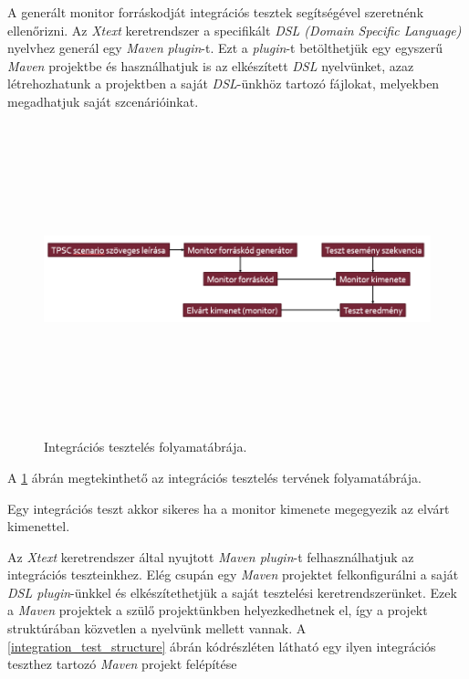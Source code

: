 A generált monitor forráskodját integrációs tesztek segítségével szeretnénk ellenőrizni.
Az \textit{Xtext} keretrendszer a specifikált \textit{DSL (Domain Specific Language)} nyelvhez generál egy \textit{Maven} \textit{plugin}-t.
Ezt a \textit{plugin}-t betölthetjük egy egyszerű \textit{Maven} projektbe és használhatjuk is az elkészített \textit{DSL} nyelvünket, azaz létrehozhatunk a projektben a saját \textit{DSL}-ünkhöz tartozó fájlokat, melyekben megadhatjuk saját szcenárióinkat.

\begin{figure}[!ht]
    \centering
    \includegraphics[width=150mm, height=9cm, keepaspectratio]{figures/integration_test_flow.png}
    \caption{Integrációs tesztelés folyamatábrája.}
    \label{testing_figure}
\end{figure}

A \ref{testing_figure} ábrán megtekinthető az integrációs tesztelés tervének folyamatábrája.

Egy integrációs teszt akkor sikeres ha a monitor kimenete megegyezik az elvárt kimenettel.

\clearpage

Az \textit{Xtext} keretrendszer által nyujtott \textit{Maven plugin}-t felhasználhatjuk az integrációs teszteinkhez.
Elég csupán egy \textit{Maven} projektet felkonfigurálni a saját \textit{DSL plugin}-ünkkel és elkészítethetjük a saját tesztelési keretrendszerünket.
Ezek a \textit{Maven} projektek a szülő projektünkben helyezkedhetnek el, így a projekt struktúrában közvetlen a nyelvünk mellett vannak.
A \ref{integration_test_structure} ábrán  kódrészléten látható egy ilyen integrációs teszthez tartozó \textit{Maven} projekt felépítése

